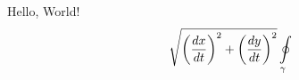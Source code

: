 \documentclass{article}
\begin{document}
Hello, World!
$$
\sqrt[]{\left(\frac{dx}{dt}\right)^{2}+\left(\frac{dy}{dt}\right)^{2} }
\\ \ointop_{\gamma}
$$
\end{document}
